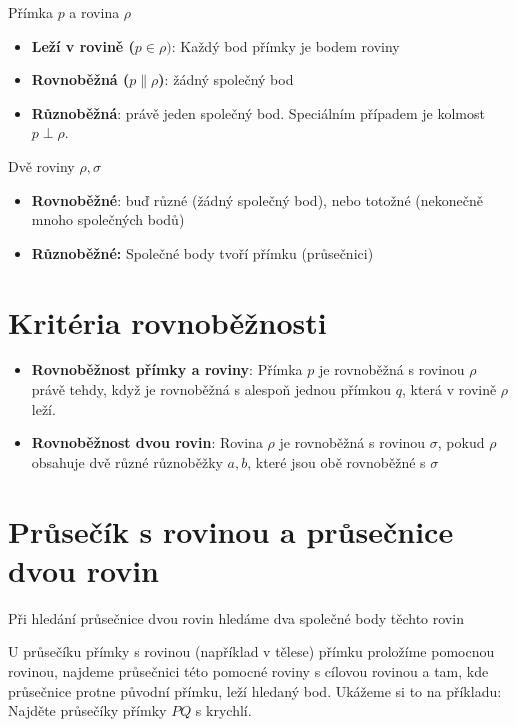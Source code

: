 \documentclass[12pt]{article}
\begin{document}
Přímka $p$ a rovina $\rho$
\begin{itemize} [itemsep = 2pt]
    \item \textbf{Leží v rovině ($p \in \rho)$}: Každý bod přímky je bodem roviny
    \item \textbf{Rovnoběžná ($p \| \rho$)}: žádný společný bod
    \item \textbf{Různoběžná}: právě jeden společný bod. Speciálním případem je kolmost $p \perp \rho$.
\end{itemize}

Dvě roviny $\rho , \sigma$
\begin{itemize} [itemsep = 2pt]
    \item  \textbf{Rovnoběžné}: buď různé (žádný společný bod), nebo totožné (nekonečně mnoho společných bodů)
    \item \textbf{Různoběžné:} Společné body tvoří přímku (průsečnici) 
\end{itemize}

\section*{Kritéria rovnoběžnosti}
\begin{itemize} [itemsep = 2pt]
    \item \textbf{Rovnoběžnost přímky a roviny}: Přímka $p$ je rovnoběžná s rovinou $\rho$ právě tehdy, když je rovnoběžná s alespoň jednou přímkou $q$, která v rovině $\rho$ leží.
    \item \textbf{Rovnoběžnost dvou rovin}: Rovina $\rho$ je rovnoběžná s rovinou $\sigma$, pokud $\rho$ obsahuje dvě různé různoběžky $a, b$, které jsou obě rovnoběžné s $\sigma$
\end{itemize}
\section*{Průsečík s rovinou a průsečnice dvou rovin}
Při hledání průsečnice dvou rovin hledáme dva společné body těchto rovin

U průsečíku přímky s rovinou (například v tělese) přímku proložíme pomocnou rovinou, najdeme průsečnici této pomocné roviny s cílovou rovinou a tam, kde průsečnice protne původní přímku, leží hledaný bod.
Ukážeme si to na příkladu: Najděte průsečíky přímky $PQ$ s krychlí.
\end{document}
